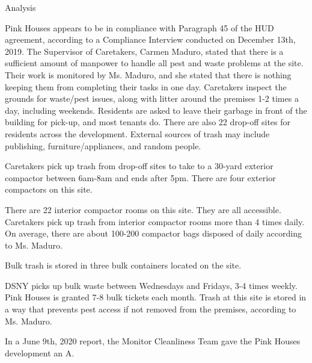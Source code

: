 Analysis 

Pink Houses appears to be in compliance with Paragraph 45 of the HUD agreement, according to a Compliance Interview conducted on December 13th, 2019. The Supervisor of Caretakers, Carmen Maduro, stated that there is a sufficient amount of manpower to handle all pest and waste problems at the site. Their work is monitored by Ms. Maduro, and she stated that there is nothing keeping them from completing their tasks in one day. Caretakers inspect the grounds for waste/pest issues, along with litter around the premises 1-2 times a day, including weekends. Residents are asked to leave their garbage in front of the building for pick-up, and most tenants do. There are also 22 drop-off sites for residents across the development. External sources of trash may include publishing, furniture/appliances, and random people. 

Caretakers pick up trash from drop-off sites to take to a 30-yard exterior compactor between 6am-8am and ends after 5pm. There are four exterior compactors on this site. 

There are 22 interior compactor rooms on this site. They are all accessible. Caretakers pick up trash from interior compactor rooms more than 4 times daily. On average, there are about 100-200 compactor bags disposed of daily according to Ms. Maduro. 

Bulk trash is stored in three bulk containers located on the site. 

DSNY picks up bulk waste between Wednesdays and Fridays, 3-4 times weekly. Pink Houses is granted 7-8 bulk tickets each month. Trash at this site is stored in a way that prevents pest access if not removed from the premises, according to Ms. Maduro.  

In a June 9th, 2020 report, the Monitor Cleanliness Team gave the Pink Houses development an A. 